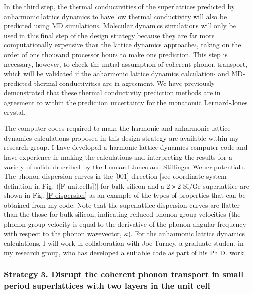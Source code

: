 \documentclass[letterpaper,12pt]{article}
\begin{document}
In the third step, the thermal conductivities of the superlattices
predicted by anharmonic lattice dynamics to have low thermal
conductivity will also be predicted using MD simulations. Molecular
dynamics simulations will only be used in this final step of the
design strategy because they are far more computationally expensive
than the lattice dynamics approaches, taking on the order of one
thousand processor hours to make one prediction. This step is
necessary, however, to check the initial assumption of coherent
phonon transport, which will be validated if the anharmonic lattice
dynamics calculation- and MD-predicted thermal conductivities are in
agreement. We have previously demonstrated that these thermal
conductivity prediction methods are in agreement to within the
prediction uncertainty for the monatomic Lennard-Jones
crystal.\cite{turney2008}

The computer codes required to make the harmonic and anharmonic
lattice dynamics calculations proposed in this design strategy are
available within my research group. I have developed a harmonic
lattice dynamics computer code and have experience in making the
calculations and interpreting the results for a variety of solids
described by the Lennard-Jones and Stillinger-Weber
potentials.\cite{landry2008a,mcgaughey2006} The phonon dispersion
curves in the [001] direction [see coordinate system definition in
Fig. (\ref{F-unitcells})] for bulk silicon and a $2\times2$ Si/Ge
superlattice are shown in Fig. \ref{F-dispersion} as an example of
the types of properties that can be obtained from my code. Note that
the superlattice dispersion curves are flatter than the those for
bulk silicon, indicating reduced phonon group velocities (the phonon
group velocity is equal to the derivative of the phonon angular
frequency with respect to the phonon wavevector, $\kappa$). For the
anharmonic lattice dynamics calculations, I will work in
collaboration with Joe Turney, a graduate student in my research
group, who has developed a suitable code as part of his Ph.D. work.

\subsubsection*{Strategy 3. Disrupt the coherent phonon transport in
small period superlattices with two layers in the unit cell}

\end{document}
